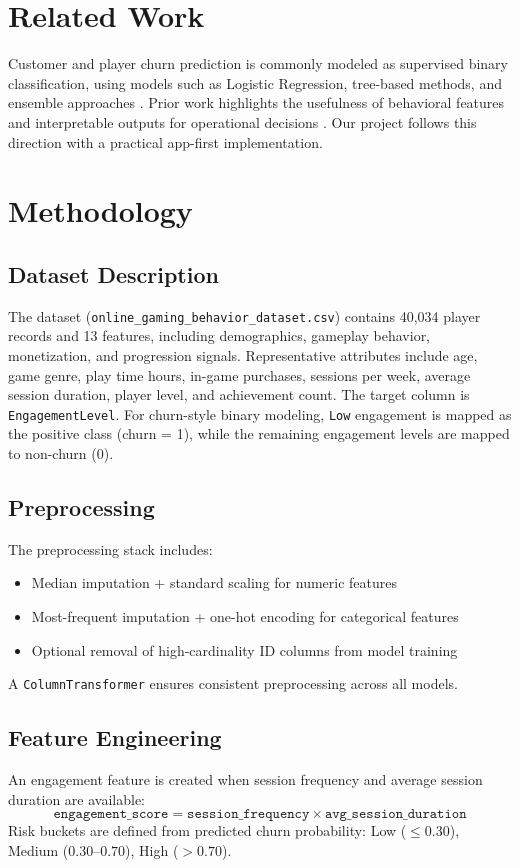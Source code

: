 \documentclass[conference]{IEEEtran}
\begin{document}
\section{Related Work}
Customer and player churn prediction is commonly modeled as supervised binary classification, using models such as Logistic Regression, tree-based methods, and ensemble approaches \cite{burez2009churn,verbeke2012new}. Prior work highlights the usefulness of behavioral features and interpretable outputs for operational decisions \cite{huang2012churn}. Our project follows this direction with a practical app-first implementation.

\section{Methodology}

\subsection{Dataset Description}
The dataset (\texttt{online\_gaming\_behavior\_dataset.csv}) contains 40,034 player records and 13 features, including demographics, gameplay behavior, monetization, and progression signals. Representative attributes include age, game genre, play time hours, in-game purchases, sessions per week, average session duration, player level, and achievement count. The target column is \texttt{EngagementLevel}. For churn-style binary modeling, \texttt{Low} engagement is mapped as the positive class (churn = 1), while the remaining engagement levels are mapped to non-churn (0).

\subsection{Preprocessing}
The preprocessing stack includes:
\begin{itemize}
    \item Median imputation + standard scaling for numeric features
    \item Most-frequent imputation + one-hot encoding for categorical features
    \item Optional removal of high-cardinality ID columns from model training
\end{itemize}
A \texttt{ColumnTransformer} ensures consistent preprocessing across all models.

\subsection{Feature Engineering}
An engagement feature is created when session frequency and average session duration are available:
\[
\texttt{engagement\_score} = \texttt{session\_frequency} \times \texttt{avg\_session\_duration}
\]
Risk buckets are defined from predicted churn probability:
Low ($\leq 0.30$), Medium ($0.30$--$0.70$), High ($>0.70$).
\end{document}
